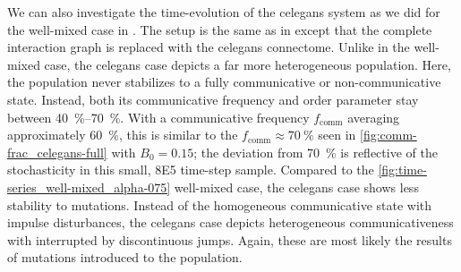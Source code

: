 \documentclass[pdflatex,lineno,referee,sn-nature]{sn-jnl}
\begin{document}
We can also investigate the time-evolution of the \gls{celegans} system
as we did for the well-mixed case in
.
The setup is the same as in
except that the complete interaction graph is replaced with the \gls{celegans} connectome.
Unlike in the well-mixed case,
the  \gls{celegans} case
depicts a far more heterogeneous population.
Here, the population never stabilizes
to a fully communicative or non-communicative state.
Instead, both its communicative frequency and order parameter
stay between \SIrange{40}{70}{\percent}.
With a communicative frequency $f_{\text{comm}}$ averaging approximately \SI{60}{\percent},
this is similar to the $f_{\text{comm}} \approx \SI{70}{\percent}$ seen
in \cref{fig:comm-frac_celegans-full} with $B_0 = 0.15$;
the deviation from \SI{70}{\percent} is reflective of the
stochasticity in this small, \num{8E5} time-step sample.
Compared to the \cref{fig:time-series_well-mixed_alpha-075} well-mixed case,
the \gls{celegans} case shows less stability to mutations.
Instead of the homogeneous communicative state with impulse disturbances,
the \gls{celegans} case depicts heterogeneous communicativeness
with interrupted by discontinuous jumps.
Again, these are most likely the results of mutations introduced
to the population.
\end{document}
